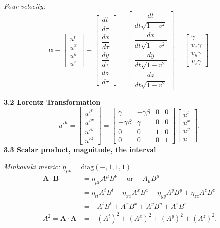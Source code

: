 \documentclass[10pt]{article}
\begin{document}
\begin{multicols*}{2}
\textit{Four-velocity:}
\[
\mathbf{u}\equiv
\begin{bmatrix}u^t\\ u^x\\ u^y\\ u^z\end{bmatrix}
\equiv
\begin{bmatrix}\dfrac{dt}{d\tau}\\[4pt]\dfrac{dx}{d\tau}\\[4pt]\dfrac{dy}{d\tau}\\[4pt]\dfrac{dz}{d\tau}\end{bmatrix}
=
\begin{bmatrix}\dfrac{dt}{dt\sqrt{1-v^2}}\\[4pt]
\dfrac{dx}{dt\sqrt{1-v^2}}\\[4pt]
\dfrac{dy}{dt\sqrt{1-v^2}}\\[4pt]
\dfrac{dz}{dt\sqrt{1-v^2}}
\end{bmatrix}
=
\begin{bmatrix}\gamma\\ v_x\gamma\\ v_y\gamma\\ v_z\gamma\end{bmatrix}.
\]

\textbf{3.2 Lorentz Transformation}
\[
u'^{\mu}=
\begin{bmatrix}
u'^t\\ u'^x\\ u'^y\\ u'^z
\end{bmatrix}
=
\begin{bmatrix}
\gamma & -\gamma\beta & 0 & 0\\
-\gamma\beta & \gamma & 0 & 0\\
0 & 0 & 1 & 0\\
0 & 0 & 0 & 1
\end{bmatrix}
\begin{bmatrix}
u^t\\ u^x\\ u^y\\ u^z
\end{bmatrix},
\]
\textbf{3.3 Scalar product, magnitude, the interval}

\textit{Minkowski metric:} $\eta_{\mu\nu}=\mathrm{diag}(-,1,1,1)$
\[
\begin{aligned}
\mathbf{A}\cdot\mathbf{B}&=\eta_{\mu\nu}A^\mu B^\nu  \quad\text{ or }\quad A_\mu B^\mu\\
&=\eta_{tt}A^tB^t+\eta_{xx}A^xB^x +\eta_{yy}A^yB^y+\eta_{zz}A^zB^z\\
&=-A^tB^t+A^xB^x+A^yB^y+A^zB^z\\
A^2=\mathbf{A}\cdot\mathbf{A}
&=-(A^t)^2+(A^x)^2+(A^y)^2+(A^z)^2.
\end{aligned}
\]


\end{multicols*}
\end{document}
